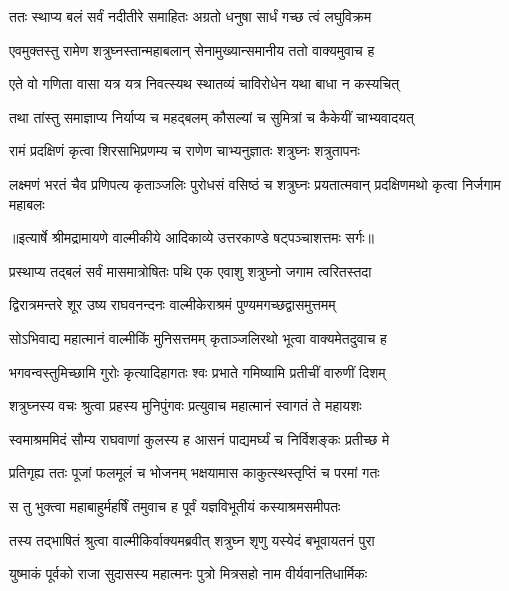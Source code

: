 \twolineshloka
{ततः स्थाप्य बलं सर्वं नदीतीरे समाहितः}
{अग्रतो धनुषा सार्धं गच्छ त्वं लघुविक्रम} %

\twolineshloka
{एवमुक्तस्तु रामेण शत्रुघ्नस्तान्महाबलान्}
{सेनामुख्यान्समानीय ततो वाक्यमुवाच ह} %

\twolineshloka
{एते वो गणिता वासा यत्र यत्र निवत्स्यथ}
{स्थातव्यं चाविरोधेन यथा बाधा न कस्यचित्} %

\twolineshloka
{तथा तांस्तु समाज्ञाप्य निर्याप्य च महद्बलम्}
{कौसल्यां च सुमित्रां च कैकेयीं चाभ्यवादयत्} %

\twolineshloka
{रामं प्रदक्षिणं कृत्वा शिरसाभिप्रणम्य च}
{राणेण चाभ्यनुज्ञातः शत्रुघ्नः शत्रुतापनः} %

\threelineshloka
{लक्ष्मणं भरतं चैव प्रणिपत्य कृताञ्जलिः}
{पुरोधसं वसिष्ठं च शत्रुघ्नः प्रयतात्मवान्}
{प्रदक्षिणमथो कृत्वा निर्जगाम महाबलः} %


{॥इत्यार्षे श्रीमद्रामायणे वाल्मीकीये आदिकाव्ये उत्तरकाण्डे षट्पञ्चाशत्तमः सर्गः॥}


\twolineshloka
{प्रस्थाप्य तद्बलं सर्वं मासमात्रोषितः पथि}
{एक एवाशु शत्रुघ्नो जगाम त्वरितस्तदा} %

\twolineshloka
{द्विरात्रमन्तरे शूर उष्य राघवनन्दनः}
{वाल्मीकेराश्रमं पुण्यमगच्छद्वासमुत्तमम्} %

\twolineshloka
{सोऽभिवाद्य महात्मानं वाल्मीकिं मुनिसत्तमम्}
{कृताञ्जलिरथो भूत्वा वाक्यमेतदुवाच ह} %

\twolineshloka
{भगवन्वस्तुमिच्छामि गुरोः कृत्यादिहागतः}
{श्वः प्रभाते गमिष्यामि प्रतीचीं वारुणीं दिशम्} %

\twolineshloka
{शत्रुघ्नस्य वचः श्रुत्वा प्रहस्य मुनिपुंगवः}
{प्रत्युवाच महात्मानं स्वागतं ते महायशः} %

\twolineshloka
{स्वमाश्रममिदं सौम्य राघवाणां कुलस्य ह}
{आसनं पाद्यमर्घ्यं च निर्विशङ्कः प्रतीच्छ मे} %

\twolineshloka
{प्रतिगृह्य ततः पूजां फलमूलं च भोजनम्}
{भक्षयामास काकुत्स्थस्तृप्तिं च परमां गतः} %

\twolineshloka
{स तु भुक्त्वा महाबाहुर्महर्षिं तमुवाच ह}
{पूर्वं यज्ञविभूतीयं कस्याश्रमसमीपतः} %

\twolineshloka
{तस्य तद्भाषितं श्रुत्वा वाल्मीकिर्वाक्यमब्रवीत्}
{शत्रुघ्न शृणु यस्येदं बभूवायतनं पुरा} %

\twolineshloka
{युष्माकं पूर्वको राजा सुदासस्य महात्मनः}
{पुत्रो मित्रसहो नाम वीर्यवानतिधार्मिकः} %

